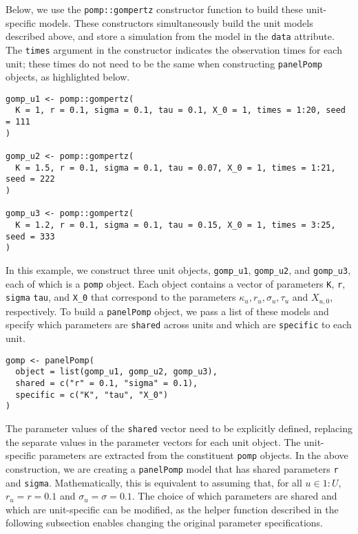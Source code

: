 Below, we use the \texttt{pomp::gompertz} constructor function to build these unit-specific models.
These constructors simultaneously build the unit models described above, and store a simulation from the model in the \texttt{data} attribute.
The \texttt{times} argument in the constructor indicates the observation times for each unit;
these times do not need to be the same when constructing \texttt{panelPomp} objects, as highlighted below.

\begin{verbatim}
gomp_u1 <- pomp::gompertz(
  K = 1, r = 0.1, sigma = 0.1, tau = 0.1, X_0 = 1, times = 1:20, seed = 111
)

gomp_u2 <- pomp::gompertz(
  K = 1.5, r = 0.1, sigma = 0.1, tau = 0.07, X_0 = 1, times = 1:21, seed = 222
)

gomp_u3 <- pomp::gompertz(
  K = 1.2, r = 0.1, sigma = 0.1, tau = 0.15, X_0 = 1, times = 3:25, seed = 333
)
\end{verbatim}

In this example, we construct three unit objects, \texttt{gomp\_u1}, \texttt{gomp\_u2}, and \texttt{gomp\_u3}, each of which is a \texttt{pomp} object.
Each object contains a vector of parameters \texttt{K}, \texttt{r}, \texttt{sigma} \texttt{tau}, and \texttt{X\_0} that correspond to the parameters \(\kappa_u, r_u, \sigma_u, \tau_u\) and \(X_{u, 0}\), respectively.
To build a \texttt{panelPomp} object, we pass a list of these models and specify which parameters are \texttt{shared} across units and which are \texttt{specific} to each unit.

\begin{verbatim}
gomp <- panelPomp(
  object = list(gomp_u1, gomp_u2, gomp_u3),
  shared = c("r" = 0.1, "sigma" = 0.1),
  specific = c("K", "tau", "X_0")
)
\end{verbatim}

The parameter values of the \texttt{shared} vector need to be explicitly defined, replacing the separate values in the parameter vectors for each unit object.
The unit-specific parameters are extracted from the constituent \texttt{pomp} objects.
In the above construction, we are creating a \texttt{panelPomp} model that has shared parameters \texttt{r} and \texttt{sigma}.
Mathematically, this is equivalent to assuming that, for all \(u \in 1:U\), \(r_u = r = 0.1\) and \(\sigma_u = \sigma = 0.1\).
The choice of which parameters are shared and which are unit-specific can be modified, as the helper function described in the following subsection enables changing the original parameter specifications.

